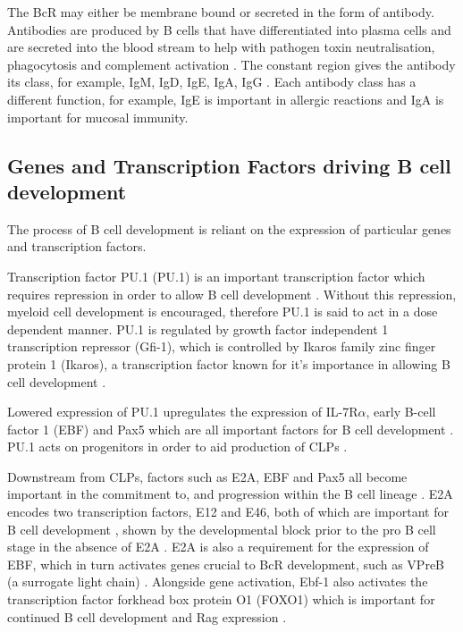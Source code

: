 The BcR may either be membrane bound or secreted in the form of antibody.
Antibodies are produced by B cells that have differentiated into plasma cells and are secreted into the blood stream to help with pathogen toxin neutralisation, phagocytosis and complement activation \citep{Janeway2008}.
The constant region gives the antibody its class, for example, IgM, IgD, IgE, IgA, IgG \citep{Pieper2013}.
Each antibody class has a different function, for example, IgE is important in allergic reactions and IgA is important for mucosal immunity.


\subsection{Genes and Transcription Factors driving B cell development}
\label{subsec:Bcellgenes}

The process of B cell development is reliant on the expression of particular genes and transcription factors.

Transcription factor PU.1 (PU.1) is an important transcription factor which requires repression in order to allow B cell development \citep{Dekoter2000}. 
Without this repression, myeloid cell development is encouraged, therefore PU.1 is said to act in a dose dependent manner.
PU.1 is regulated by growth factor independent 1 transcription repressor (Gfi-1), which is controlled by Ikaros family zinc finger protein 1 (Ikaros), a transcription factor known for it's importance in allowing B cell development \citep{Yoshida2006, Busslinger2004}. 

Lowered expression of PU.1 upregulates the expression of IL-7R$\alpha$, early B-cell factor 1 (EBF) and Pax5 which are all important factors for B cell development \citep{Hagman2006}.
PU.1 acts on progenitors in order to aid production of CLPs \citep{Hagman2006}.

Downstream from CLPs, factors such as E2A, EBF and Pax5 all become important in the commitment to, and progression within the B cell lineage \citep{Mansson2008}.
E2A encodes two transcription factors, E12 and E46, both of which are important for B cell development \citep{Bain1997}, shown by the developmental block prior to the pro B cell stage in the absence of E2A \citep{Bain1994}.
E2A is also a requirement for the expression of EBF, which in turn activates genes crucial to BcR development, such as VPreB (a surrogate light chain) \citep{Welinder2011}.
Alongside gene activation, Ebf-1 also activates the transcription factor forkhead box protein O1 (FOXO1) which is important for continued B cell development and Rag expression \citep{Amin2008}.

